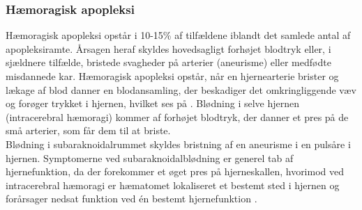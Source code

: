 \subsubsection{Hæmoragisk apopleksi}
Hæmoragisk apopleksi opstår i 10-15\% af tilfældene iblandt det samlede antal af apopleksiramte\cite{Sundhed.dk2014}. Årsagen heraf skyldes hovedsagligt forhøjet blodtryk eller, i sjældnere tilfælde, bristede svagheder på arterier (aneurisme) eller medfødte misdannede kar\cite{Schulze2011}. Hæmoragisk apopleksi opstår, når en hjernearterie brister og lækage af blod danner en blodansamling, der beskadiger det omkringliggende væv og forøger trykket i hjernen, hvilket ses på . Blødning i selve hjernen (intracerebral hæmoragi) kommer af forhøjet blodtryk, der danner et pres på de små arterier, som får dem til at briste. \citep{Caplan2006} \\
Blødning i subaraknoidalrummet skyldes bristning af en aneurisme i en pulsåre i hjernen\cite{Schulze2011}. Symptomerne ved subaraknoidalblødning er generel tab af hjernefunktion, da der forekommer et øget pres på hjerneskallen, hvorimod ved intracerebral hæmoragi er hæmatomet lokaliseret et bestemt sted i hjernen og forårsager nedsat funktion ved én bestemt hjernefunktion \citep{Caplan2006}. 









